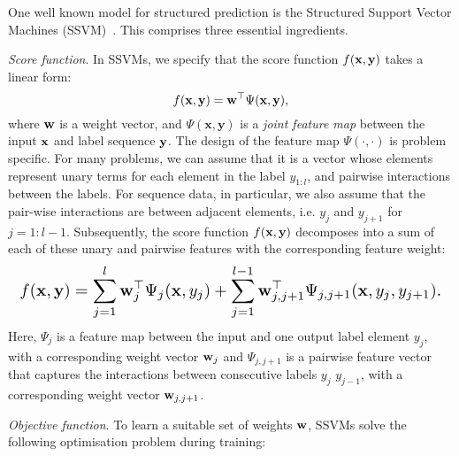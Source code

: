 One well known model for structured prediction is the Structured Support Vector Machines (SSVM)~\cite{joachims2009predicting,tsochantaridis2005large}. 
This comprises three essential ingredients.

\emph{Score function}. In SSVMs, we specify that the score function $f(\mathbf{x}, \mathbf{y})$ takes a linear form:
\begin{equation*}
f(\mathbf{x}, \mathbf{y}) = \mathbf{w}^\top \Psi(\mathbf{x}, \mathbf{y}),
\end{equation*}
where $\mathbf{w}$ is a weight vector, and $\Psi(\mathbf{x}, \mathbf{y})$ is a \emph{joint feature map} 
between the input $\mathbf{x}$ and label sequence $\mathbf{y}$.
The design of the feature map $\Psi(\cdot,\cdot)$ is problem specific. 
For many problems, we can assume that it is a vector whose elements represent unary 
 terms for each element in the label $y_{1:l}$, and pairwise interactions between the labels. 
 For sequence data, in particular, we also assume that the pair-wise interactions are between 
 adjacent elements, i.e. $y_j$ and $y_{j+1}$ for $j=1:l-1$. 
 Subsequently, the score function $f(\mathbf{x},\mathbf{y})$ decomposes into a sum of 
 each of these unary and pairwise features with the corresponding feature weight:
\begin{equation}
\label{eq:jointfeature}
\resizebox{0.99\linewidth}{!}{$\displaystyle
f(\x, \y) =  %
\sum_{j=1}^l \w_j^\top \Psi_j(\x, y_j)  
  + \sum_{j=1}^{l-1} \w_{j,j+1}^\top \Psi_{j,j+1}(\x, y_{j}, y_{j+1}). %
  $}
\end{equation}
Here, $\Psi_j$ is a feature map between the input and one output label element $y_j$, with a corresponding weight vector $\mathbf{w}_j$
and $\Psi_{j,j+1}$ is a pairwise feature vector that captures the interactions between consecutive labels $y_j$ $y_{j-1}$, 
with a corresponding weight vector $\mathbf{w}_{j,j+1}$.

\emph{Objective function}. 
To learn a suitable set of weights $\mathbf{w}$, SSVMs solve the following optimisation problem during training:


